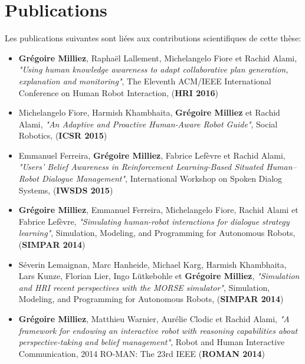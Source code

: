 \documentclass[a4paper,11pt,twoside]{StyleThese}
\begin{document}



\section{Publications}

Les publications suivantes sont liées aux contributions scientifiques de cette thèse:

\begin{itemize}
\item \textbf{Grégoire Milliez}, Raphaël Lallement, Michelangelo Fiore et Rachid Alami, \textit{"Using human knowledge awareness to adapt collaborative plan generation, explanation and monitoring"}, The Eleventh ACM/IEEE International Conference on Human Robot Interaction, (\textbf{HRI 2016})
\item Michelangelo Fiore, Harmish Khambhaita, \textbf{Grégoire Milliez} et Rachid Alami, \textit{"An Adaptive and Proactive Human-Aware Robot Guide"}, Social Robotics, (\textbf{ICSR 2015})
\item Emmanuel Ferreira, \textbf{Grégoire Milliez}, Fabrice Lefèvre et Rachid Alami, \textit{"Users’ Belief Awareness in Reinforcement Learning-Based Situated Human–Robot Dialogue Management"}, International Workshop on Spoken Dialog Systems, (\textbf{IWSDS 2015})
\item \textbf{Grégoire Milliez}, Emmanuel Ferreira, Michelangelo Fiore, Rachid Alami et Fabrice Lefèvre, \textit{"Simulating human-robot interactions for dialogue strategy learning"}, Simulation, Modeling, and Programming for Autonomous Robots, (\textbf{SIMPAR 2014})
\item Séverin Lemaignan, Marc Hanheide, Michael Karg, Harmish Khambhaita, Lars Kunze, Florian Lier, Ingo Lütkebohle et \textbf{Grégoire Milliez}, \textit{"Simulation and HRI recent perspectives with the MORSE simulator"}, Simulation, Modeling, and Programming for Autonomous Robots, (\textbf{SIMPAR 2014})
\item \textbf{Grégoire Milliez}, Matthieu Warnier, Aurélie Clodic et Rachid Alami, \textit{"A framework for endowing an interactive robot with reasoning capabilities about perspective-taking and belief management"}, Robot and Human Interactive Communication, 2014 RO-MAN: The 23rd IEEE (\textbf{ROMAN 2014})
\end{itemize}
\end{document}
